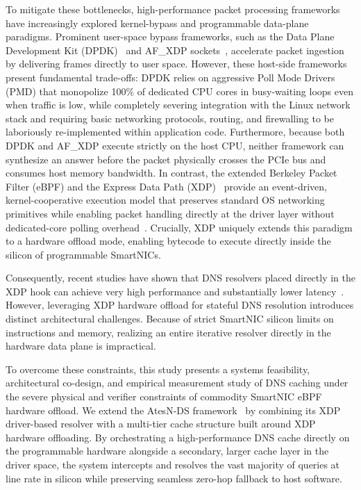 \documentclass[a4paper,fleqn,colorlinks,hidelinks]{cas-sc}
\begin{document}
To mitigate these bottlenecks, high-performance packet processing frameworks have increasingly explored kernel-bypass and programmable data-plane paradigms. Prominent user-space bypass frameworks, such as the Data Plane Development Kit (DPDK)~\citep{kourtis2015enhancing} and AF\_XDP sockets~\citep{10.1145/3281411.3281443}, accelerate packet ingestion by delivering frames directly to user space. However, these host-side frameworks present fundamental trade-offs: DPDK relies on aggressive Poll Mode Drivers (PMD) that monopolize 100\% of dedicated CPU cores in busy-waiting loops even when traffic is low, while completely severing integration with the Linux network stack and requiring basic networking protocols, routing, and firewalling to be laboriously re-implemented within application code. Furthermore, because both DPDK and AF\_XDP execute strictly on the host CPU, neither framework can synthesize an answer before the packet physically crosses the PCIe bus and consumes host memory bandwidth. In contrast, the extended Berkeley Packet Filter (eBPF) and the Express Data Path (XDP)~\citep{10.1145/3281411.3281443} provide an event-driven, kernel-cooperative execution model that preserves standard OS networking primitives while enabling packet handling directly at the driver layer without dedicated-core polling overhead~\citep{vieira2020fast, 9665095}. Crucially, XDP uniquely extends this paradigm to a hardware offload mode, enabling bytecode to execute directly inside the silicon of programmable SmartNICs.

Consequently, recent studies have shown that DNS resolvers placed directly in the XDP hook can achieve very high performance and substantially lower latency~\citep{sbesc_estendido, 10.1145/3672197.3673439}. However, leveraging XDP hardware offload for stateful DNS resolution introduces distinct architectural challenges. Because of strict SmartNIC silicon limits on instructions and memory, realizing an entire iterative resolver directly in the hardware data plane is impractical.

To overcome these constraints, this study presents a systems feasibility, architectural co-design, and empirical measurement study of DNS caching under the severe physical and verifier constraints of commodity SmartNIC eBPF hardware offload. We extend the AtesN-DS framework~\citep{sbesc_estendido} by combining its XDP driver-based resolver with a multi-tier cache structure built around XDP hardware offloading. By orchestrating a high-performance DNS cache directly on the programmable hardware alongside a secondary, larger cache layer in the driver space, the system intercepts and resolves the vast majority of queries at line rate in silicon while preserving seamless zero-hop fallback to host software.
\end{document}
